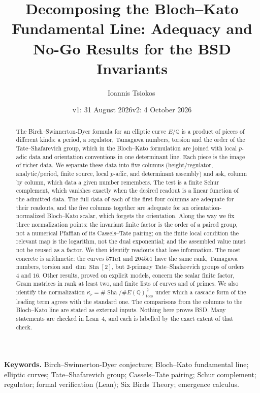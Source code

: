 \documentclass[11pt]{article}
\title{Decomposing the Bloch--Kato Fundamental Line: Adequacy and No-Go
Results for the BSD Invariants}
\author{Ioannis Tsiokos\,\orcidlink{0009-0009-7659-5964}}
\date{v1: 31 August 2026\quad\textperiodcentered\quad v2: 4 October 2026}
\theoremstyle{definition}
\newcommand{\Q}{\mathbb{Q}}
\newcommand{\Sha}{\operatorname{Sha}}
\newcommand{\tors}{\operatorname{tors}}
\newcommand{\kapr}{\kappa_r}
\begin{document}
\maketitle
\thispagestyle{firstpage}

\begin{abstract}
The Birch--Swinnerton-Dyer formula for an elliptic curve $E/\Q$ is a
product of pieces of different kinds: a period, a regulator, Tamagawa
numbers, torsion and the order of the Tate--Shafarevich group, which in
the Bloch--Kato formulation are joined with local $p$-adic data and
orientation conventions in one determinant line.  Each piece is the image
of richer data.  We separate these data into five columns
(height/regulator, analytic/period, finite source, local $p$-adic, and
determinant assembly) and ask, column by column, which data a given
number remembers.  The test is a finite Schur complement, which vanishes
exactly when the desired readout is a linear function of the admitted
data.  The full data of each of the first four columns are adequate for
their readouts, and the five columns together are adequate for an
orientation-normalized Bloch--Kato scalar, which forgets the orientation.
Along the way we fix three normalization points: the invariant finite
factor is the order of a paired group, not a numerical Pfaffian of its
Cassels--Tate pairing; on the finite local condition the relevant map is
the logarithm, not the dual exponential; and the assembled value must not
be reused as a factor.  We then identify readouts that lose information.
The most concrete is arithmetic: the curves $571a1$ and $2045b1$ have the
same rank, Tamagawa numbers, torsion and $\dim\Sha[2]$, but $2$-primary
Tate--Shafarevich groups of orders $4$ and $16$.  Other results, proved on
explicit models, concern the scalar finite factor, Gram matrices in rank
at least two, and finite lists of curves and of primes.  We also identify
the normalization $\kapr=\#\Sha/\#E(\Q)_{\tors}^{\,2}$ under which a
cascade form of the leading term agrees with the standard one.  The
comparisons from the columns to the Bloch--Kato line are stated as
external inputs.  Nothing here proves BSD.  Many statements are checked
in Lean~4, and each is labelled by the exact extent of that check.
\end{abstract}

\medskip
\noindent\textbf{Keywords.} Birch--Swinnerton-Dyer conjecture; Bloch--Kato fundamental line; elliptic curves; Tate--Shafarevich group; Cassels--Tate pairing; Schur complement; regulator; formal verification (Lean); Six Birds Theory; emergence calculus.
\end{document}
